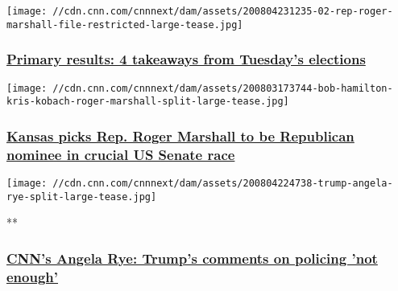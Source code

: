 \href{/2020/08/05/politics/primary-results-takeaways-august-4/index.html}{}

\texttt{[image: //cdn.cnn.com/cnnnext/dam/assets/200804231235-02-rep-roger-marshall-file-restricted-large-tease.jpg]}

\hypertarget{primary-results-4-takeaways-from-tuesdays-elections}{%
\subsubsection{\texorpdfstring{\href{/2020/08/05/politics/primary-results-takeaways-august-4/index.html}{Primary
results: 4 takeaways from Tuesday's
elections}}{Primary results: 4 takeaways from Tuesday's elections}}\label{primary-results-4-takeaways-from-tuesdays-elections}}

\href{/2020/08/04/politics/kansas-senate-election-primary-results/index.html}{}

\texttt{[image: //cdn.cnn.com/cnnnext/dam/assets/200803173744-bob-hamilton-kris-kobach-roger-marshall-split-large-tease.jpg]}

\hypertarget{kansas-picks-rep-roger-marshall-to-be-republican-nominee-in-crucial-us-senate-race}{%
\subsubsection{\texorpdfstring{\href{/2020/08/04/politics/kansas-senate-election-primary-results/index.html}{Kansas
picks Rep. Roger Marshall to be Republican nominee in crucial US Senate
race}}{Kansas picks Rep. Roger Marshall to be Republican nominee in crucial US Senate race}}\label{kansas-picks-rep-roger-marshall-to-be-republican-nominee-in-crucial-us-senate-race}}

\href{/videos/politics/2020/08/05/trump-policing-systemic-racism-black-americans-axios-angela-rye-cpt-vpx.cnn}{}

\texttt{[image: //cdn.cnn.com/cnnnext/dam/assets/200804224738-trump-angela-rye-split-large-tease.jpg]}

**

\hypertarget{cnns-angela-rye-trumps-comments-on-policing-not-enough}{%
\subsubsection{\texorpdfstring{\href{/videos/politics/2020/08/05/trump-policing-systemic-racism-black-americans-axios-angela-rye-cpt-vpx.cnn}{CNN's
Angela Rye: Trump's comments on policing 'not
enough'}}{CNN's Angela Rye: Trump's comments on policing 'not enough'}}\label{cnns-angela-rye-trumps-comments-on-policing-not-enough}}


